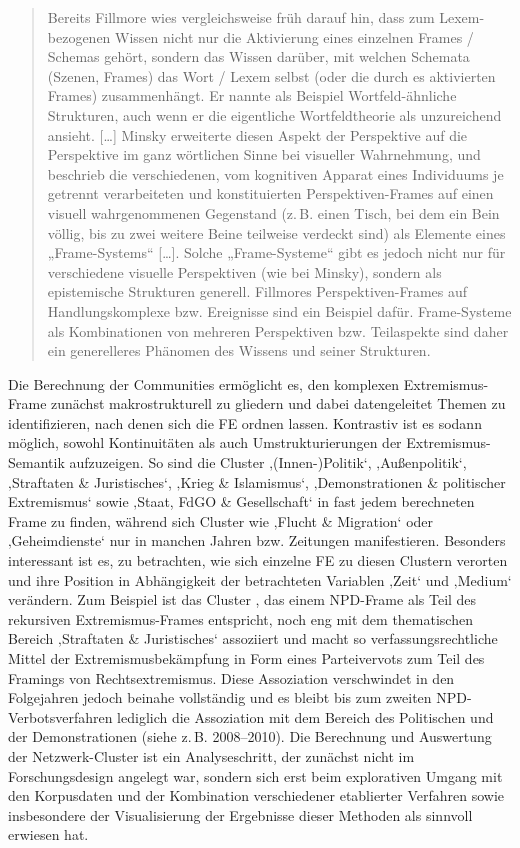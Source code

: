 \begin{quote}
Bereits Fillmore wies vergleichsweise früh darauf hin, dass zum Lexem-bezogenen Wissen nicht nur die Aktivierung eines einzelnen Frames / Schemas gehört, sondern das Wissen darüber, mit welchen Schemata (Szenen, Frames) das Wort / Lexem selbst (oder die durch es aktivierten Frames) zusammenhängt. Er nannte als Beispiel Wortfeld-ähnliche Strukturen, auch wenn er die eigentliche Wortfeldtheorie als unzureichend ansieht. {[}\ldots{]} Minsky erweiterte diesen Aspekt der Perspektive auf die Perspektive im ganz wörtlichen Sinne bei visueller Wahrnehmung, und beschrieb die verschiedenen, vom kognitiven Apparat eines Individuums je getrennt verarbeiteten und konstituierten Perspektiven-Frames auf einen visuell wahrgenommenen Gegenstand (z.\,B. einen Tisch, bei dem ein Bein völlig, bis zu zwei weitere Beine teilweise verdeckt sind) als Elemente eines „Frame-Systems`` {[}\ldots{]}. Solche „Frame-Systeme`` gibt es jedoch nicht nur für verschiedene visuelle Perspektiven (wie bei Minsky), sondern als epistemische Strukturen generell. Fillmores Perspektiven-Frames auf Handlungskomplexe bzw. Ereignisse sind ein Beispiel dafür. Frame-Systeme als Kombinationen von mehreren Perspektiven bzw. Teilaspekte sind daher ein generelleres Phänomen des Wissens und seiner Strukturen. \autocite[635-636]{busseFrameSemantikKompendium2012}
\end{quote}

\largerpage
Die Berechnung der Communities ermöglicht es, den komplexen Extremismus-Frame zunächst makrostrukturell zu gliedern und dabei datengeleitet Themen zu identifizieren, nach denen sich die FE ordnen lassen. Kontrastiv ist es sodann möglich, sowohl Kontinuitäten als auch Umstrukturierungen der Extremismus-Semantik aufzuzeigen. So sind die Cluster ‚(Innen\mbox{-})Politik`, ‚Außenpolitik`, ‚Straftaten \& Juristisches`, ‚Krieg \& Islamismus`, ‚Demonstrationen \& politischer Extremismus` sowie ‚Staat, FdGO \& Gesellschaft` in fast jedem berechneten Frame zu finden, während sich Cluster wie ‚Flucht \& Migration` oder ‚Geheimdienste` nur in manchen Jahren bzw. Zeitungen manifestieren. Besonders interessant ist es, zu betrachten, wie sich einzelne FE zu diesen Clustern verorten und ihre Position in Abhängigkeit der betrachteten Variablen ‚Zeit` und ‚Medium` verändern. Zum Beispiel ist das Cluster , das einem NPD-Frame als Teil des rekursiven Extremismus-Frames entspricht, noch eng mit dem thematischen Bereich ‚Straftaten \& Juristisches` assoziiert und macht so verfassungsrechtliche Mittel der Extremismusbekämpfung in Form eines Parteivervots zum Teil des Framings von Rechtsextremismus. Diese Assoziation verschwindet in den Folgejahren jedoch beinahe vollständig und es bleibt bis zum zweiten NPD-Verbotsverfahren lediglich die Assoziation mit dem Bereich des Politischen und der Demonstrationen (siehe z.\,B. 2008--2010). Die Berechnung und Auswertung der Netzwerk-Cluster ist ein Analyseschritt, der zunächst nicht im Forschungsdesign angelegt war, sondern sich erst beim explorativen Umgang mit den Korpusdaten und der Kombination verschiedener etablierter Verfahren sowie insbesondere der Visualisierung der Ergebnisse dieser Methoden als sinnvoll erwiesen hat.

